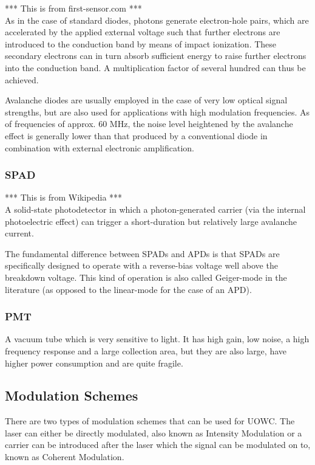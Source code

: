 \documentclass{article}
\begin{document}
*** This is from first-sensor.com *** \\
As in the case of standard diodes, photons generate electron-hole pairs, which are accelerated by the applied external voltage such that further electrons are introduced to the conduction band by means of impact ionization. These secondary electrons can in turn absorb sufficient energy to raise further electrons into the conduction band. A multiplication factor of several hundred can thus be achieved.

Avalanche diodes are usually employed in the case of very low optical signal strengths, but are also used for applications with high modulation frequencies. As of frequencies of approx. 60 MHz, the noise level heightened by the avalanche effect is generally lower than that produced by a conventional diode in combination with external electronic amplification.

\subsubsection{\ac{SPAD}}
*** This is from Wikipedia ***\\
A solid-state photodetector in which a photon-generated carrier (via the internal photoelectric effect) can trigger a short-duration but relatively large avalanche current.

The fundamental difference between SPADs and APDs is that SPADs are specifically designed to operate with a reverse-bias voltage well above the breakdown voltage. This kind of operation is also called Geiger-mode in the literature (as opposed to the linear-mode for the case of an APD).

\subsubsection{\ac{PMT}}
A vacuum tube which is very sensitive to light. It has high gain, low noise, a high frequency response and a large collection area, but they are also large, have higher power consumption and are quite fragile.

\subsection{Modulation Schemes}
There are two types of modulation schemes that can be used for \ac{UOWC}. The laser can either be directly modulated, also known as Intensity Modulation or a carrier can be introduced after the laser which the signal can be modulated on to, known as Coherent Modulation.
 
\end{document}
